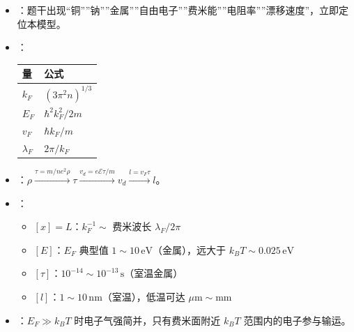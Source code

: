 \begin{tipbox}[快速识别与解题技巧]
\begin{itemize}
    \item {}：题干出现``铜''''钠''''金属''''自由电子''''费米能''''电阻率''''漂移速度''，立即定位本模型。
    \item {}：
    \begin{center}
    \begin{tabular}{ll}
    \toprule
    \textbf{量} & \textbf{公式} \\
    \midrule
    $k_F$ & $(3\pi^2 n)^{1/3}$ \\
    $E_F$ & $\hbar^2k_F^2/2m$ \\
    $v_F$ & $\hbar k_F/m$ \\
    $\lambda_F$ & $2\pi/k_F$ \\
    \bottomrule
    \end{tabular}
    \end{center}
    \item {}：$\rho\xrightarrow{\tau=m/ne^2\rho}\tau\xrightarrow{v_d=e\mathcal{E}\tau/m}v_d\xrightarrow{l=v_F\tau}l$。
    \item {}：
    \begin{itemize}[nosep]
        \item $[x]=L$：$k_F^{-1}\sim$ 费米波长 $\lambda_F/2\pi$
        \item $[E]$：$E_F$ 典型值 $1\sim10\,\text{eV}$（金属），远大于 $k_BT\sim0.025\,\text{eV}$
        \item $[\tau]$：$10^{-14}\sim10^{-13}\,\text{s}$（室温金属）
        \item $[l]$：$1\sim10\,\text{nm}$（室温），低温可达 $\mu\text{m}\sim\text{mm}$
    \end{itemize}
    \item {}：$E_F\gg k_BT$ 时电子气强简并，只有费米面附近 $k_BT$ 范围内的电子参与输运。
\end{itemize}
\end{tipbox}

